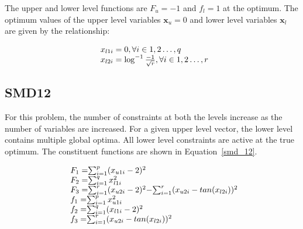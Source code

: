 The upper and lower level functions are $F_u=-1$ and $f_l=1$  at the optimum. The optimum values of the upper level variables $\mathbf{x}_{u}=0$ and lower level variables $\mathbf{x}_l$ are given by the relationship: 

\begin{equation}
\begin{array}{lr}
\text{}\hspace{2mm} x_{l1i}=0,  \forall i \in {1,2\ldots,q} \\
\text{}\hspace{2mm} x_{l2i}=\log^{-1} \frac{-1}{\sqrt{r}} ,  \forall i \in {1,2\ldots,r} \\
\end{array}
\label{basic_11}
\end{equation}



\subsection{SMD12}

For this problem, the number of constraints at both the levels increase as the number of variables are increased. For a given upper level vector, the lower level contains multiple global optima. All lower level constraints are active at the true optimum. The constituent functions are shown in Equation~\ref{smd_12}.


\begin{equation}
\begin{array}{lr}
\text{}\hspace{2mm} F_1=$$\sum_{	i=1}^{p} (x_{u1i}-2)^{2} $$\\
\text{}\hspace{2mm} F_2=$$\sum_{	i=1}^{q} x_{l1i}^{2} $$\\
\text{}\hspace{2mm} F_3=$$\sum_{	i=1}^{r} (x_{u2i}-2)^{2} $$-$$\sum_{	i=1}^{r} (x_{u2i}-tan (x_{l2i}))^{2} $$\\

\text{}\hspace{2mm} f_1=$$\sum_{	i=1}^{p} x_{u1i}^{2} $$\\
\text{}\hspace{2mm} f_2=$$\sum_{	i=1}^{q} (x_{l1i}-2)^{2} $$\\
\text{}\hspace{2mm} f_3=$$\sum_{	i=1}^{r} (x_{u2i}-tan (x_{l2i}))^{2} $$\\
\end{array}
\label{smd_12}
\end{equation}

